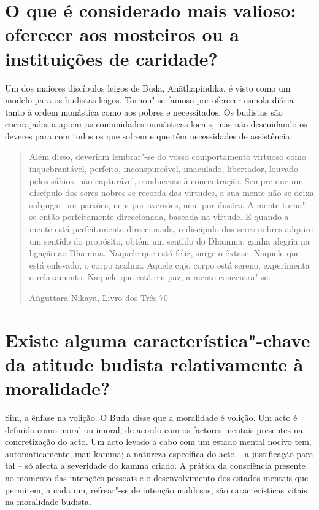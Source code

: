 \section{O que é considerado mais valioso: oferecer aos mosteiros ou a
  instituições de caridade?}

Um dos maiores discípulos leigos de Buda, Anāthapindika, é visto como um
modelo para os budistas leigos. Tornou"-se famoso por oferecer esmola
diária tanto à ordem monástica como aos pobres e necessitados. Os
budistas são encorajados a apoiar as comunidades monásticas locais, mas
não descuidando os deveres para com todos os que sofrem e que têm
necessidades de assistência.

\clearpage
{}

\begin{verse}

Além disso, deveriam lembrar"-se do vosso comportamento virtuoso
como inquebrantável, perfeito, inconspurcável, imaculado, libertador,
louvado pelos sábios, não capturável, conducente à concentração. Sempre
que um discípulo dos seres nobres se recorda das virtudes, a sua mente
não se deixa subjugar por paixões, nem por aversões, nem por ilusões. A
mente torna"-se então perfeitamente direccionada, baseada na virtude. E
quando a mente está perfeitamente direccionada, o discípulo dos seres
nobres adquire um sentido do propósito, obtém um sentido do Dhamma,
ganha alegria na ligação ao Dhamma. Naquele que está feliz, surge o
êxtase. Naquele que está enlevado, o corpo acalma. Aquele cujo corpo
está sereno, experimenta o relaxamento. Naquele que está em paz, a mente
concentra"-se.

{\raggedleft
Aṅguttara Nikāya, Livro dos Três 70
\par}

\end{verse}

\section{Existe alguma característica"-chave da atitude budista relativamente à
  moralidade?}

Sim, a ênfase na volição. O Buda disse que a moralidade é volição. Um
acto é definido como moral ou imoral, de acordo com os factores mentais
presentes na concretização do acto. Um acto levado a cabo com um estado
mental nocivo tem, automaticamente, mau kamma; a natureza específica do
acto -- a justificação para tal -- só afecta a severidade do kamma
criado. A prática da consciência presente no momento das intenções
pessoais e o desenvolvimento dos estados mentais que permitem, a cada
um, refrear"-se de intenção maldosas, são características vitais na
moralidade budista.

